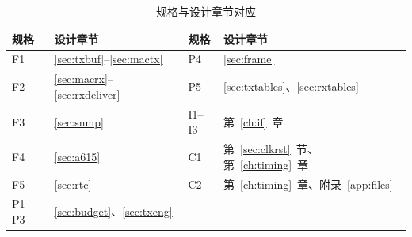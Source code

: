 \begin{table}\centering\small
\caption{规格与设计章节对应}\label{tab:trace}
\begin{tabularx}{\linewidth}{>{\centering\arraybackslash}p{1.6cm}L>{\centering\arraybackslash}p{1.6cm}L}
\toprule
规格 & 设计章节 & 规格 & 设计章节 \\
\midrule
F1 & \ref{sec:txbuf}--\ref{sec:mactx} & P4 & \ref{sec:frame} \\
F2 & \ref{sec:macrx}--\ref{sec:rxdeliver} & P5 & \ref{sec:txtables}、\ref{sec:rxtables} \\
F3 & \ref{sec:snmp} & I1--I3 & 第~\ref{ch:if}~章 \\
F4 & \ref{sec:a615} & C1 & 第~\ref{sec:clkrst}~节、第~\ref{ch:timing}~章 \\
F5 & \ref{sec:rtc} & C2 & 第~\ref{ch:timing}~章、附录~\ref{app:files} \\
P1--P3 & \ref{sec:budget}、\ref{sec:txeng} &  &  \\
\bottomrule
\end{tabularx}
\end{table}

